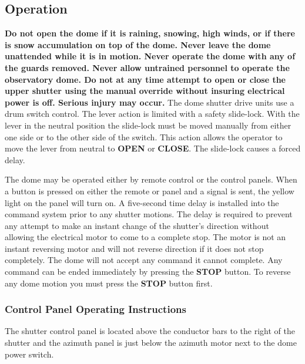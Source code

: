 \documentclass[12pt,titlepage]{article}
\begin{document}
\subsection{Operation}
\textbf{Do not open the dome if it is raining, snowing, high winds, or if there is snow accumulation on top of the dome.
Never leave the dome unattended while it is in motion.
Never operate the dome with any of the guards removed.
Never allow untrained personnel to operate the observatory dome.
Do not at any time attempt to open or close the upper shutter using the manual override without insuring electrical power is off.
Serious injury may occur.}
The dome shutter drive units use a drum switch control.
The lever action is limited with a safety slide-lock.
With the lever in the neutral position the slide-lock must be moved manually from either one side or to the other side of the switch.
This action allows the operator to move the lever from neutral to \textbf{OPEN} or \textbf{CLOSE}.
The slide-lock causes a forced delay.
\par The dome may be operated either by remote control or the control panels.
When a button is pressed on either the remote or panel and a signal is sent, the yellow light on the panel will turn on.
A five-second time delay is installed into the command system prior to any shutter motions.
The delay is required to prevent any attempt to make an instant change of the shutter's direction without allowing the electrical motor to come to a complete stop.
The motor is not an instant reversing motor and will not reverse direction if it does not stop completely.
The dome will not accept any command it cannot complete.
Any command can be ended immediately by pressing the \textbf{STOP} button.
To reverse any dome motion you must press the \textbf{STOP} button first. 

\subsubsection{Control Panel Operating Instructions}

The shutter control panel is located above the conductor bars to the right of the shutter and the azimuth panel is just below the azimuth motor next to the dome power switch.
\end{document}
